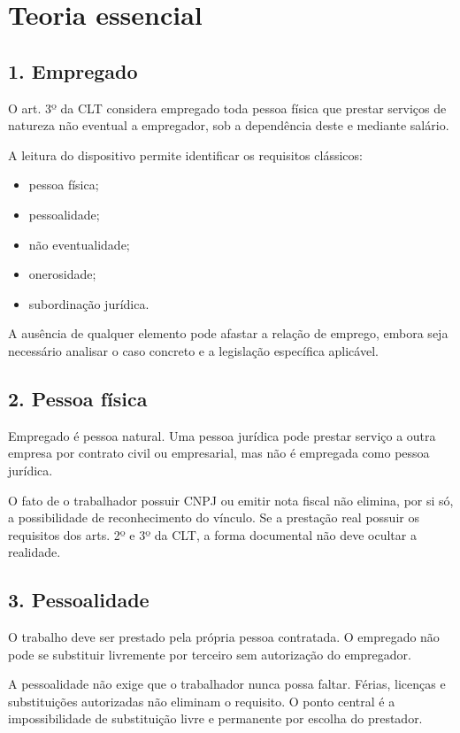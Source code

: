 \documentclass[11pt,a4paper]{article}
\begin{document}
\section*{Teoria essencial}

\subsection*{1. Empregado}

O art. 3º da CLT considera empregado toda pessoa física que prestar serviços de natureza não eventual a empregador, sob a dependência deste e mediante salário.

A leitura do dispositivo permite identificar os requisitos clássicos:

\begin{itemize}
  \item pessoa física;
  \item pessoalidade;
  \item não eventualidade;
  \item onerosidade;
  \item subordinação jurídica.
\end{itemize}

A ausência de qualquer elemento pode afastar a relação de emprego, embora seja necessário analisar o caso concreto e a legislação específica aplicável.

\subsection*{2. Pessoa física}

Empregado é pessoa natural. Uma pessoa jurídica pode prestar serviço a outra empresa por contrato civil ou empresarial, mas não é empregada como pessoa jurídica.

O fato de o trabalhador possuir CNPJ ou emitir nota fiscal não elimina, por si só, a possibilidade de reconhecimento do vínculo. Se a prestação real possuir os requisitos dos arts. 2º e 3º da CLT, a forma documental não deve ocultar a realidade.

\subsection*{3. Pessoalidade}

O trabalho deve ser prestado pela própria pessoa contratada. O empregado não pode se substituir livremente por terceiro sem autorização do empregador.

A pessoalidade não exige que o trabalhador nunca possa faltar. Férias, licenças e substituições autorizadas não eliminam o requisito. O ponto central é a impossibilidade de substituição livre e permanente por escolha do prestador.
\end{document}
